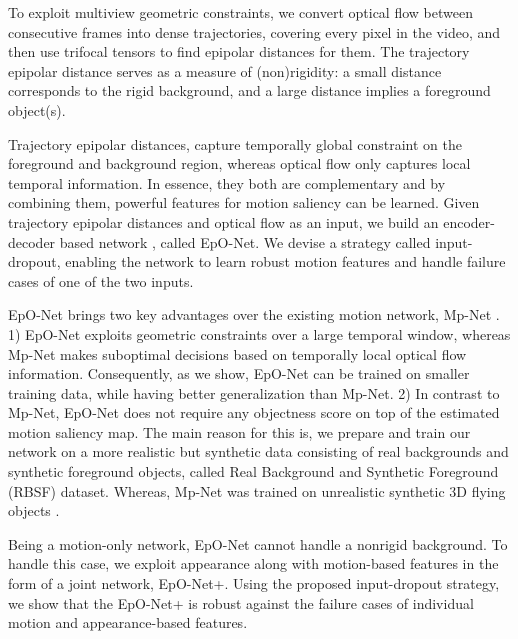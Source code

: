 \documentclass[10pt,twocolumn,letterpaper]{article}
\begin{document}
To exploit multiview geometric constraints, we convert optical flow between consecutive frames into dense trajectories, covering every pixel in the video, and then use trifocal tensors to find epipolar distances \cite{hartley2003multiple} for them. The trajectory epipolar distance serves as a measure of (non)rigidity: a small distance corresponds to the rigid background, and a large distance implies a foreground object(s). 

Trajectory epipolar distances,  capture temporally global constraint on the foreground and background region, whereas optical flow only captures local temporal information.
In essence, they both are complementary and by combining them, powerful features for motion saliency can be learned. Given trajectory epipolar distances and optical flow as an input, we build an encoder-decoder based network \cite{uNet}, called EpO-Net. We devise a strategy called input-dropout, enabling the network to learn robust motion features and handle failure cases of one of the two inputs.

EpO-Net brings two key advantages over the existing motion network, Mp-Net \cite{MpNet}. 1) EpO-Net exploits geometric constraints over a large temporal window, whereas Mp-Net makes suboptimal decisions based on temporally local optical flow information. Consequently, as we show, EpO-Net can be trained on smaller training data, while having better generalization than Mp-Net. 2) In contrast to Mp-Net, EpO-Net does not require any objectness score on top of the estimated motion saliency map. The main reason for this is, we prepare and train our network on a more realistic but synthetic data consisting of real backgrounds and synthetic foreground objects, called Real Background and Synthetic Foreground (RBSF) dataset. Whereas, Mp-Net was trained on unrealistic synthetic 3D flying objects \cite{F3DT}.

Being a motion-only network, EpO-Net cannot handle a nonrigid background. To handle this case, we exploit appearance \cite{deeplab} along with motion-based features in the form of a joint network, EpO-Net+.
Using the proposed input-dropout strategy, we show that the EpO-Net+ is robust against the failure cases of individual motion and appearance-based features.
\end{document}

